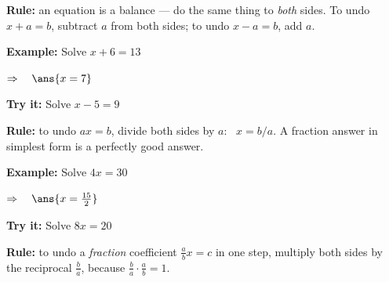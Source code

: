 \documentclass[12pt]{article}
\begin{document}


\begin{formulabox}
\textbf{Rule:} an equation is a balance --- do the same thing to \emph{both} sides.
To undo $x + a = b$, subtract $a$ from both sides; to undo $x - a = b$, add $a$.
\end{formulabox}

\begin{examplebox}
\textbf{Example:} \quad Solve $x + 6 = 13$

$\Rightarrow\quad \ans{x = 7}$
\end{examplebox}

\begin{tryitbox}
\textbf{Try it:} \quad Solve $x - 5 = 9$\\[2pt]
\end{tryitbox}


\begin{formulabox}
\textbf{Rule:} to undo $ax = b$, divide both sides by $a$:
\ $x = b/a$. A fraction answer in simplest form is a perfectly good answer.
\end{formulabox}

\begin{examplebox}
\textbf{Example:} \quad Solve $4x = 30$

$\Rightarrow\quad \ans{x = \tfrac{15}{2}}$
\end{examplebox}

\begin{tryitbox}
\textbf{Try it:} \quad Solve $8x = 20$\\[2pt]
\end{tryitbox}


\begin{formulabox}
\textbf{Rule:} to undo a \emph{fraction} coefficient $\tfrac{a}{b}x = c$ in one
step, multiply both sides by the reciprocal $\tfrac{b}{a}$, because
$\tfrac{b}{a} \cdot \tfrac{a}{b} = 1$.
\end{formulabox}
\end{document}
